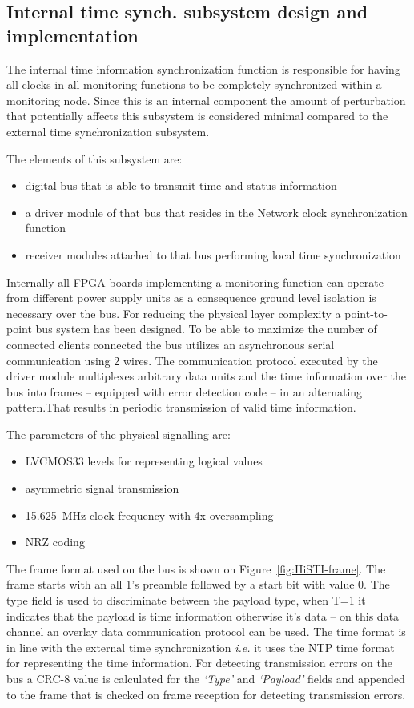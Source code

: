 \documentclass[journal]{IEEEtran}
\begin{document}
\subsection{Internal time synch. subsystem design and implementation}\label{sec:Internal-Impl}

The internal time information synchronization function is responsible for having all clocks in all monitoring functions
to be completely synchronized within a monitoring node. Since this is an internal component the amount of perturbation
that potentially affects this subsystem is considered minimal compared to the external time synchronization subsystem.

The elements of this subsystem are:
\begin{itemize}
    \item digital bus that is able to transmit time and status information
    \item a driver module of that bus that resides in the Network clock synchronization function
    \item receiver modules attached to that bus performing local time synchronization
\end{itemize}

Internally all FPGA boards implementing a monitoring function can operate from different power supply units as a
consequence ground level
isolation is necessary over the bus. For reducing the physical layer complexity
a point-to-point bus system has been designed. To be able to maximize the number of connected clients connected the
bus utilizes an asynchronous serial communication using 2 wires. The communication protocol executed by the driver
module
multiplexes arbitrary data units and the time information over the bus into frames -- equipped with error detection
code --
in an alternating pattern.That results in periodic transmission of valid time information.

The parameters of the physical signalling are:
\begin{itemize}
    \item LVCMOS33 levels for representing logical values
    \item asymmetric signal transmission
    \item \SI{15.625}{\mega\hertz} clock frequency with 4x oversampling
    \item NRZ coding
\end{itemize}

The frame format used on the bus is shown on Figure~\ref{fig:HiSTI-frame}. The frame starts with an all 1's preamble
followed by a start bit with value 0. The type field is used to discriminate between the payload type, when T=1 it
indicates that the payload is
time information otherwise it's data -- on this data channel an overlay data communication protocol can be used.
The time format is in line with the external time synchronization \emph{i.e.} it uses the NTP
time format for representing the time information. For detecting transmission errors on the bus a CRC-8 value is
calculated
for the \emph{`Type'} and \emph{`Payload'} fields and appended to the frame that is checked on frame reception for
detecting
transmission errors.
\end{document}
